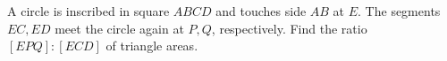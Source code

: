 A circle is inscribed in square $ABCD$ and touches side $AB$ at $E$. The segments $EC,ED$ meet the circle again at $P,Q$, respectively. Find the ratio $[EPQ]:[ECD]$ of triangle areas.
